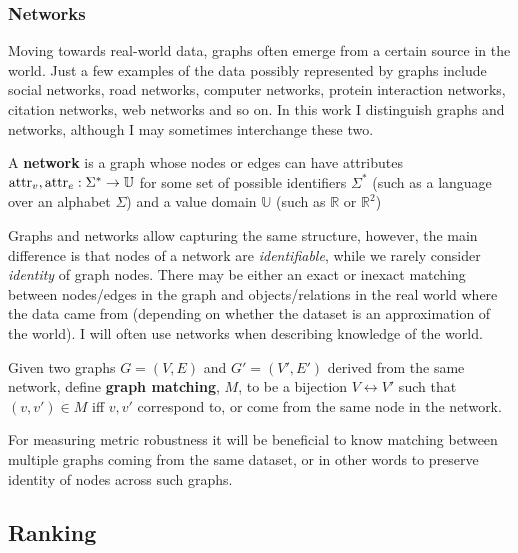 \subsubsection{Networks}

Moving towards real-world data, graphs often emerge from a certain source in the world.
Just a few examples of the data possibly represented by graphs include social networks, road networks, computer networks, protein interaction networks, citation networks, web networks and so on.
In this work I distinguish graphs and networks, although I may sometimes interchange these two.

\begin{definition}[Network]
    A \textbf{network} is a graph whose nodes or edges can have attributes $\textnormal{attr}_v, \textnormal{attr}_e : \Sigma^* \rightarrow \mathbb{U}$ for some set of possible identifiers $\Sigma^*$ (such as a language over an alphabet $\Sigma$) and a value domain $\mathbb{U}$ (such as $\mathbb{R}$ or $\mathbb{R}^2$)
\end{definition}

Graphs and networks allow capturing the same structure, however, the main difference is that nodes of a network are \textit{identifiable}, while we rarely consider \textit{identity} of graph nodes.
There may be either an exact or inexact matching between nodes/edges in the graph and objects/relations in the real world where the data came from (depending on whether the dataset is an approximation of the world).
I will often use networks when describing knowledge of the world.

\begin{definition}
    Given two graphs $G = (V, E)$ and $G' = (V', E')$ derived from the same network, define \textbf{graph matching}, $M$, to be a bijection $V \leftrightarrow V'$ such that $(v, v') \in M$ iff $v, v'$ correspond to, or come from the same node in the network.
\end{definition}

For measuring metric robustness it will be beneficial to know matching between multiple graphs coming from the same dataset, or in other words to preserve identity of nodes across such graphs.

\subsection{Ranking}

